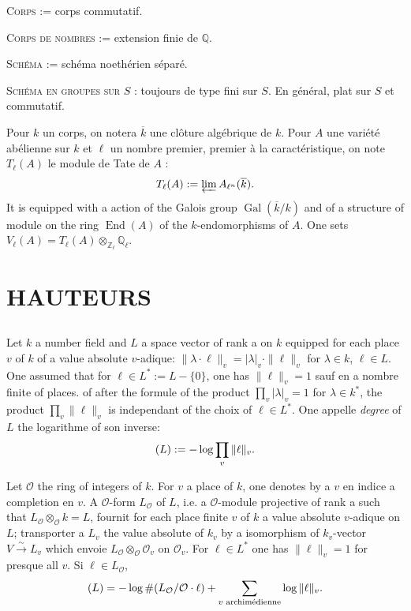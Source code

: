 \documentclass[12pt,a4paper]{article}
\theoremstyle{plain}
\theoremstyle{definition}
\theoremstyle{remark}
\DeclareMathOperator{\End}{End}
\DeclareMathOperator{\Gal}{Gal}
\newcommand{\QQ}{\mathbb{Q}}
\newcommand{\ZZ}{\mathbb{Z}}
\newcommand{\cO}{\mathcal{O}}
\let\deg\relax
\providecommand{\QQ}{\mathbb{Q}}
\providecommand{\ZZ}{\mathbb{Z}}
\providecommand{\cO}{\mathcal{O}}
\providecommand{\End}{\operatorname{End}}
\providecommand{\Gal}{\operatorname{Gal}}
\begin{document}
\textsc{Corps} := corps commutatif.

\textsc{Corps de nombres} := extension finie de $\QQ$.

\textsc{Schéma} := schéma noethérien séparé.

\textsc{Schéma en groupes sur} $S$ : toujours de type fini sur $S$. En général, plat sur $S$ et commutatif.

Pour $k$ un corps, on notera $\overline{k}$ une clôture algébrique de $k$. Pour $A$ une variété abélienne sur $k$ et $\ell$ un nombre premier, premier à la caractéristique, on note $T_\ell(A)$ le module de Tate de $A$ :
\[
T_\ell(A) := \varprojlim A_{\ell^n}(\overline{k}).
\]
It is equipped with a action of the Galois group $\Gal(\overline{k}/k)$ and of a structure of module on the ring $\End(A)$ of the $k$-endomorphisms of $A$. One sets $V_\ell(A) = T_\ell(A) \otimes_{\ZZ_\ell} \QQ_\ell$.

\section{HAUTEURS}

\subsection{}

Let $k$ a number field and $L$ a space vector of rank a on $k$ equipped for each place $v$ of $k$ of a value absolute $v$-adique: $\|\lambda \cdot \ell\|_v = |\lambda|_v \cdot \|\ell\|_v$ for $\lambda \in k$, $\ell \in L$. One assumed that for $\ell \in L^* := L - \{0\}$, one has $\|\ell\|_v = 1$ sauf en a nombre finite of places. of after the formule of the product $\prod_v |\lambda|_v = 1$ for $\lambda \in k^*$, the product $\prod_v \|\ell\|_v$ is independant of the choix of $\ell \in L^*$. One appelle \emph{degree} of $L$ the logarithme of son inverse:
\[
\deg(L) := -\log \prod_v \|\ell\|_v.
\]

Let $\cO$ the ring of integers of $k$. For $v$ a place of $k$, one denotes by a $v$ en indice a completion en $v$. A $\cO$-form $L_{\cO}$ of $L$, i.e. a $\cO$-module projective of rank a such that $L_{\cO} \otimes_{\cO} k = L$, fournit for each place finite $v$ of $k$ a value absolute $v$-adique on $L$; transporter a $L_v$ the value absolute of $k_v$ by a isomorphism of $k_v$-vector $V \xrightarrow{\sim} L_v$ which envoie $L_{\cO} \otimes_{\cO} \cO_v$ on $\cO_v$. For $\ell \in L^*$ one has $\|\ell\|_v = 1$ for presque all $v$. Si $\ell \in L_{\cO}$,
\[
\deg(L) = -\log \#(L_{\cO}/\cO \cdot \ell) + \sum_{v \text{ archimédienne}} \log \|\ell\|_v.
\]
\end{document}
